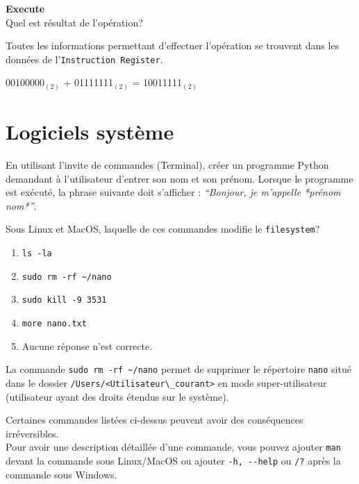 \begin{Exercice}[5 minutes] \textbf{Execute}\\
    Quel est résultat de l'opération?
\end{Exercice}

   \begin{conseil}
        Toutes les informations permettant d’effectuer l’opération se trouvent dans les données de l’\lstinline{Instruction Register}.
    \end{conseil}

\begin{solution}
    00100000$_{(2)}$ + 01111111$_{(2)}$ = 10011111$_{(2)}$
\end{solution}


\section{Logiciels système}

\begin{Exercice}[10 minutes]
    En utilisant l’invite de commandes (Terminal), créer un programme Python demandant à l’utilisateur d’entrer son nom et son prénom. Lorsque le programme est exécuté, la phrase suivante doit s’afficher : \textit{``Bonjour, je m’appelle *prénom nom*''}.
\end{Exercice}

\begin{solution}
    
\end{solution}


\begin{Exercice}[5 minutes]
    Sous Linux et MacOS, laquelle de ces commandes modifie le \lstinline{filesystem}?
    \begin{enumerate}
        \item \lstinline{ls -la}
        \item \lstinline{sudo rm -rf ~/nano}
        \item \lstinline{sudo kill -9 3531}
        \item \lstinline{more nano.txt}
        \item Aucune réponse n'est correcte.
    \end{enumerate}
    \begin{solution}
        La commande \lstinline{sudo rm -rf ~/nano} permet de supprimer le répertoire \lstinline{nano} situé dans le dossier \lstinline{/Users/<Utilisateur\_courant>} en mode super-utilisateur (utilisateur ayant des droits étendus sur le système).
    \end{solution}
    \begin{attention}
        Certaines commandes listées ci-dessus peuvent avoir des conséquences irréversibles.\\
        Pour avoir une description détaillée d'une commande, vous pouvez ajouter \lstinline{man} devant la commande sous Linux/MacOS ou ajouter \lstinline{-h, --help} ou \lstinline{/?} après la commande sous Windows.
    \end{attention}
\end{Exercice}

